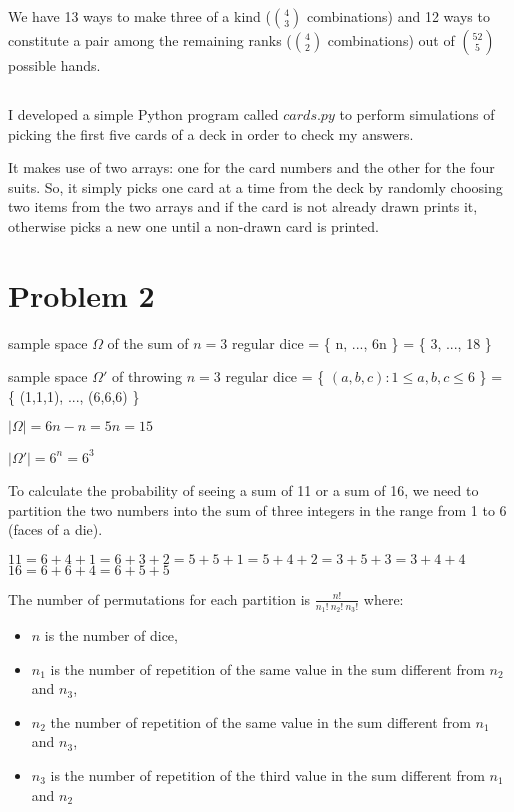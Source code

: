 \documentclass[11pt]{article}
\begin{document}
\bigskip
We have 13 ways to make three of a kind ($ \displaystyle \binom{4}{3}$ combinations) and 12 ways to constitute a pair among the remaining ranks
($ \displaystyle \binom{4}{2}$ combinations) out of $ \displaystyle \binom{52}{5}$ possible hands.


\subsection{}
I developed a simple Python program called $cards.py$ to perform simulations of picking the first five cards of a deck in order to check my answers.

\bigskip
It makes use of two arrays: one for the card numbers and the other for the four suits. \newline
So, it simply picks one card at a time from the deck by randomly choosing two items from the two arrays
and if the card is not already drawn prints it, otherwise picks a new one until a non-drawn card is printed.

\newpage
\section{Problem 2}
sample space $\Omega$ of the sum of $n=3$ regular dice = \{ n, ..., 6n \} = \{ 3, ..., 18 \}

\bigskip
\noindent
sample space $\Omega'$ of throwing $n=3$ regular dice = \{ $(a,b,c) : 1 \leq a,b,c \leq 6$ \} = \{ (1,1,1), ..., (6,6,6) \}

\bigskip
\noindent
$ \displaystyle |\Omega| = 6n - n = 5n = 15 $

\bigskip
\noindent
$ \displaystyle |\Omega'| = 6^n = 6^3 $

\bigskip
To calculate the probability of seeing a sum of 11 or a sum of 16, we need to partition the two numbers into the sum of three integers
in the range from 1 to 6 (faces of a die).

\bigskip
$ 11 = 6+4+1 = 6+3+2 = 5+5+1 = 5+4+2 = 3+5+3 = 3+4+4 $ \newline
\indent
$ 16 = 6+6+4 = 6+5+5 $

\bigskip
The number of permutations for each partition is $ \displaystyle \frac{n!}{n_1! \ n_2! \ n_3!} $ where:
\begin{itemize}
  \item $n$ is the number of dice,
  \item $n_1$ is the number of repetition of the same value in the sum different from $n_2$ and $n_3$,
  \item $n_2$ the number of repetition of the same value in the sum different from $n_1$ and $n_3$,
  \item $n_3$ is the number of repetition of the third value in the sum different from $n_1$ and $n_2$
\end{itemize}
\end{document}
